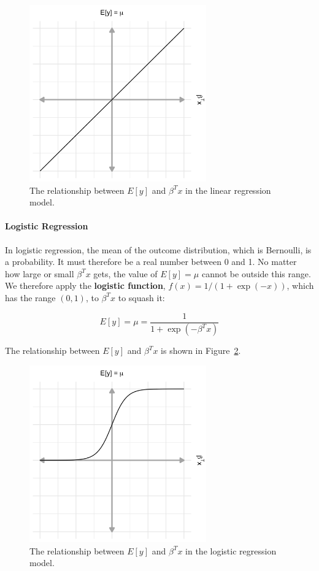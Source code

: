 \begin{figure}
\begin{center}
\includegraphics[width=3in]{img/l02-figure1-linreg.png}
\caption{The relationship between $E[y]$ and $\beta^T x$ in the linear regression model. \label{fig:identitylink}}
\end{center}
\end{figure}

\paragraph{Logistic Regression} In logistic regression, the mean of the outcome distribution, which is Bernoulli, is a probability. It must therefore be a real number between 0 and 1. No matter how large or small $\beta^T x$ gets, the value of $E[y] = \mu$ cannot be outside this range. We therefore apply the \textbf{logistic function}, $f(x) = 1/(1 + \exp(-x))$, which has the range $(0, 1)$, to $\beta^T x$ to squash it:

$$ E[y] = \mu = \frac{1}{1 + \exp{(-\beta^Tx)}} $$

The relationship between $E[y]$ and $\beta^T x$ is shown in Figure~\ref{fig:logitlink}.

\begin{figure}
\begin{center}
\includegraphics[width=3in]{img/l02-figure2-logistic.png}
\caption{The relationship between $E[y]$ and $\beta^T x$ in the logistic regression model. \label{fig:logitlink}}
\end{center}
\end{figure}

